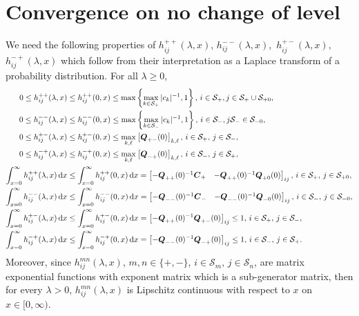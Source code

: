 \section{Convergence on no change of level}\label{sec: no change convergence}

We need the following properties of \(h_{ij}^{++}(\lambda,x),\,h_{ij}^{--}(\lambda,x),\) \(h_{ij}^{+-}(\lambda,x) ,\) \( h_{ij}^{-+}(\lambda,x) \) which follow from their interpretation as a Laplace transform of a probability distribution. For all \(\lambda \geq 0\), 
\begin{align*}
	0\leq h_{ij}^{++}(\lambda,x) &\leq  h_{ij}^{++}(0,x)  \leq \max\left\{\max_{k\in\mathcal S_+}|c_k|^{-1},1\right\},\, i\in\mathcal S_+,j\in\mathcal{S}_+\cup\mathcal S_{+0},
	\\0\leq  h_{ij}^{--}(\lambda,x)  &\leq  h_{ij}^{--}(0,x)  \leq \max\left\{\max_{k\in\mathcal S_-}|c_k|^{-1},1\right\},\, i\in\mathcal S_-,j\mathcal{S}_-\in\mathcal S_{-0},
	\\0\leq  h_{ij}^{+-}(\lambda,x)  &\leq  h_{ij}^{+-}(0,x)  \leq \max_{k,\ell}\left[\boldsymbol{Q}_{+-}(0)\right]_{k,\ell}, \, i\in\mathcal S_+,\, j\in\mathcal S_-,
	\\0\leq  h_{ij}^{-+}(\lambda,x)  &\leq  h_{ij}^{-+}(0,x)  \leq \max_{k,\ell}\left[\boldsymbol{Q}_{-+}(0)\right]_{k,\ell}, \, i\in\mathcal S_-,\, j \in\mathcal S_+,
	\\ \int_{x=0}^\infty  h_{ij}^{++}(\lambda,x) \, \mathrm{d} x &\leq \int_{x=0}^\infty  h_{ij}^{++}(0,x) \, \mathrm{d} x = \begin{bmatrix} -\boldsymbol{Q}_{++}(0)^{-1}\boldsymbol{C}_+ & -\boldsymbol Q_{++}(0)^{-1}\boldsymbol Q_{+0}(0) \end{bmatrix}_{ij}, \, i\in\mathcal S_+,\,j\in\mathcal S_{+0},
	\\ \int_{x=0}^\infty  h_{ij}^{--}(\lambda,x) \, \mathrm{d} x &\leq \int_{x=0}^\infty  h_{ij}^{--}(0,x) \, \mathrm{d} x = \begin{bmatrix} -\boldsymbol{Q}_{--}(0)^{-1}\boldsymbol{C}_- & -\boldsymbol Q_{--}(0)^{-1}\boldsymbol Q_{-0}(0) \end{bmatrix}_{ij}, \, i\in\mathcal S_-,\,j\in\mathcal S_{-0},
	\\ \int_{x=0}^\infty  h_{ij}^{+-}(\lambda,x) \, \mathrm{d} x &\leq \int_{x=0}^\infty  h_{ij}^{+-}(0,x) \, \mathrm{d} x = \left[-\boldsymbol{Q}_{++}(0)^{-1}\boldsymbol{Q}_{+-}(0)\right]_{ij}\leq 1, \, i\in\mathcal S_+,\, j\in\mathcal S_-,
	\\ \int_{x=0}^\infty  h_{ij}^{-+}(\lambda,x) \, \mathrm{d} x &\leq \int_{x=0}^\infty  h_{ij}^{-+}(0,x) \, \mathrm{d} x = \left[-\boldsymbol{Q}_{--}(0)^{-1}\boldsymbol{Q}_{-+}(0)\right]_{ij}\leq 1, \, i\in\mathcal S_-,\, j \in\mathcal S_+. 
\end{align*}
Moreover, since \(h_{ij}^{mn}(\lambda,x)\), \(m,n\in \{+,-\}\), \(i\in\mathcal S_m,\,j\in\mathcal S_n\), are matrix exponential functions with exponent matrix which is a sub-generator matrix, then for every \(\lambda >0\), \(h_{ij}^{mn}(\lambda,x)\) is Lipschitz continuous with respect to \(x\) on \(x\in[0,\infty)\). 

